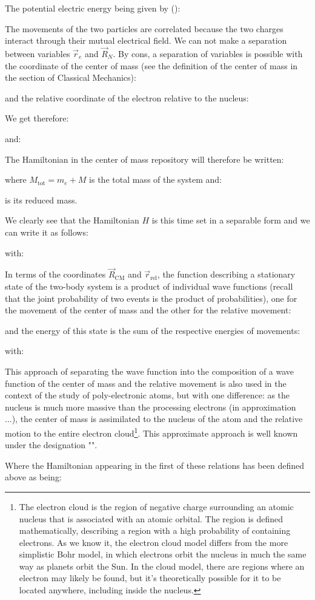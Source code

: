 	The potential electric energy being given by ():
	
	The movements of the two particles are correlated because the two charges interact through their mutual electrical field. We can not make a separation between variables $\vec{r}_e$ and $\vec{R}_N$. By cons, a separation of variables is possible with the coordinate of the center of mass (see the definition of the center of mass in the section of Classical Mechanics):
	
	and the relative coordinate of the electron relative to the nucleus:
	
	We get therefore:
	
	and:
	
	The Hamiltonian in the center of mass repository will therefore be written:
	
	where $M_{\text{tot}}=m_e+M$ is the total mass of the system and:
	
	is its reduced mass.
	
	We clearly see that the Hamiltonian $H$ is this time set in a separable form and we can write it as follows:
	
	with:
	
	In terms of the coordinates $\vec{R}_{\text{CM}}$ and $\vec{r}_{\text{rel}}$, the function describing a stationary state of the two-body system is a product of individual wave functions (recall that the joint probability of two events is the product of probabilities), one for the movement of the center of mass and the other for the relative movement:
	
	and the energy of this state is the sum of the respective energies of movements:
	
	with:
	
	\begin{tcolorbox}[title=Remark,colframe=black,arc=10pt]
	This approach of separating the wave function into the composition of a wave function of the center of mass and the relative movement is also used in the context of the study of poly-electronic atoms, but with one difference: as the nucleus is much more massive than the processing electrons (in approximation ...), the center of mass is assimilated to the nucleus of the atom and the relative motion to the entire electron cloud\footnote{The electron cloud is the region of negative charge surrounding an atomic nucleus that is associated with an atomic orbital. The region is defined mathematically, describing a region with a high probability of containing electrons. As we know it, the electron cloud model differs from the more simplistic Bohr model, in which electrons orbit the nucleus in much the same way as planets orbit the Sun. In the cloud model, there are regions where an electron may likely be found, but it's theoretically possible for it to be located anywhere, including inside the nucleus.}. This approximate approach is well known under the designation "".
	\end{tcolorbox}
	Where the Hamiltonian appearing in the first of these relations has been defined above as being:
	
